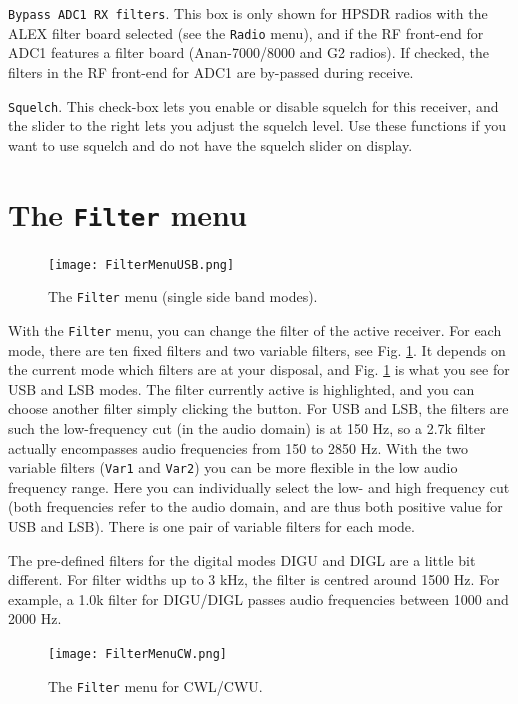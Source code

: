 \documentclass[12pt]{book}
\def\rett#1{\texttt{\color{red}#1}}
\def\bltt#1{\texttt{\color{blue}#1}}
\begin{document}
\rett{Bypass ADC1 RX filters}. This box is only shown for HPSDR radios with the ALEX filter board
selected (see the \bltt{Radio} menu), and if the RF front-end for ADC1
features a filter board (Anan-7000/8000 and G2 radios).
If checked, the filters in the RF front-end for ADC1
are by-passed during receive.

\rett{Squelch}. This check-box lets you enable or disable squelch for this receiver, and the slider
to the right lets you adjust the squelch level. Use these functions if you want to use squelch
and do not have the squelch slider on display.

\section{The \texttt{Filter} menu}

\begin{figure}[ht]
\center
\texttt{[image: FilterMenuUSB.png]}
\caption{The \bltt{Filter} menu (single side band modes).}
\label{fig:FilterMenuUSB}
\end{figure}

With the \bltt{Filter} menu, you can change the filter of the active receiver. For each mode,
there
are ten fixed filters and two variable filters, see Fig. \ref{fig:FilterMenuUSB}. It
depends on the current mode which filters are at your disposal, and Fig. \ref{fig:FilterMenuUSB}
is what you see for USB and LSB modes. The filter currently active is highlighted, and
you can choose another filter simply clicking the button. For USB and LSB, the filters
are such the low-frequency cut (in the audio domain) is at 150 Hz, so a 2.7k filter
actually encompasses audio frequencies from 150 to 2850 Hz. With the two variable filters
(\texttt{Var1} and \texttt{Var2}) you can be more flexible in the low audio frequency range. Here you
can individually select the low- and high frequency cut (both frequencies refer to
the audio domain, and are thus both positive value for USB and LSB). There is one pair of
variable filters for each mode.

The pre-defined filters for the digital modes DIGU and DIGL are a little bit different.
For filter widths up to 3 kHz, the filter is centred around 1500 Hz. For example,
a 1.0k filter for DIGU/DIGL passes audio frequencies between 1000 and 2000 Hz.

\begin{figure}[ht]
\center
\texttt{[image: FilterMenuCW.png]}
\caption{The \bltt{Filter} menu for CWL/CWU.}
\label{fig:FilterMenuCW}
\end{figure}
\end{document}
